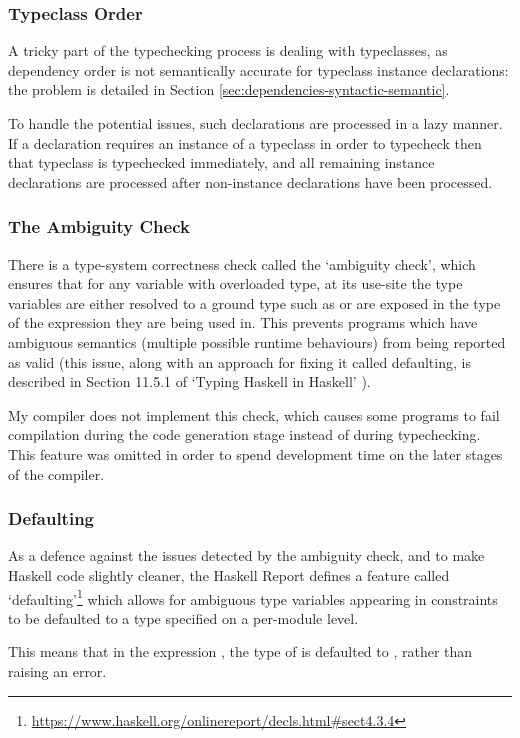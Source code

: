 \documentclass[dissertation.tex]{subfiles}
\begin{document}
{{        \subsubsection{Typeclass Order}
        {
            A tricky part of the typechecking process is dealing with typeclasses, as dependency order is not semantically accurate for typeclass instance declarations: the problem is detailed in Section \ref{sec:dependencies-syntactic-semantic}.
            
            To handle the potential issues, such declarations are processed in a lazy manner. If a declaration requires an instance of a typeclass in order to typecheck then that typeclass is typechecked immediately, and all remaining instance declarations are processed after non-instance declarations have been processed.
        }
        \subsubsection{The Ambiguity Check}
        {
            There is a type-system correctness check called the `ambiguity check', which ensures that for any variable with overloaded type, at its use-site the type variables are either resolved to a ground type such as  or are exposed in the type of the expression they are being used in. This prevents programs which have ambiguous semantics (multiple possible runtime behaviours) from being reported as valid (this issue, along with an approach for fixing it called defaulting, is described in Section 11.5.1 of `Typing Haskell in Haskell' \cite{THIH}). 

            My compiler does not implement this check, which causes some programs to fail compilation during the code generation stage instead of during typechecking. This feature was omitted in order to spend development time on the later stages of the compiler.
        }
        \subsubsection{Defaulting}
        {
            As a defence against the issues detected by the ambiguity check, and to make Haskell code slightly cleaner, the Haskell Report defines a feature called `defaulting'\footnote{\url{https://www.haskell.org/onlinereport/decls.html\#sect4.3.4}} which allows for ambiguous type variables appearing in  constraints to be defaulted to a type specified on a per-module level. 

            This means that in the expression , the type of  is defaulted to , rather than raising an error.

}}}
\end{document}
